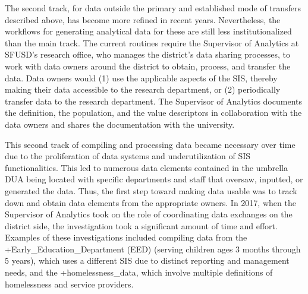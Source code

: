 \documentclass[
]{WileySix}
\begin{document}
The second track, for data outside the primary and established mode of transfers described above, has become more refined in recent years. Nevertheless, the workflows for generating analytical data for these are still less institutionalized than the main track. The current routines require the Supervisor of Analytics at SFUSD's research office, who manages the district's data sharing processes, to work with data owners around the district to obtain, process, and transfer the data. Data owners would (1) use the applicable aspects of the SIS, thereby making their data accessible to the research department, or (2) periodically transfer data to the research department. The Supervisor of Analytics documents the definition, the population, and the value descriptors in collaboration with the data owners and shares the documentation with the university.

This second track of compiling and processing data became necessary over time due to the proliferation of data systems and underutilization of SIS functionalities. This led to numerous data elements contained in the umbrella DUA being located with specific departments and staff that oversaw, inputted, or generated the data. Thus, the first step toward making data usable was to track down and obtain data elements from the appropriate owners. In 2017, when the Supervisor of Analytics took on the role of coordinating data exchanges on the district side, the investigation took a significant amount of time and effort. Examples of these investigations included compiling data from the +Early\_Education\_Department\textbar{} (EED) (serving children ages 3 months through 5 years), which uses a different SIS due to distinct reporting and management needs, and the +homelessness\_data\textbar, which involve multiple definitions of homelessness and service providers.
\end{document}
